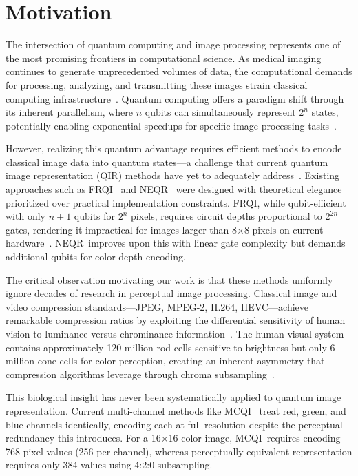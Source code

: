 \documentclass{ipol}
\newcommand{\frqi}{\textsc{FRQI}}
\newcommand{\neqr}{\textsc{NEQR}}
\newcommand{\mcqi}{\textsc{MCQI}}
\begin{document}
\FloatBarrier
\section{Motivation}
\label{sec:motivation}

The intersection of quantum computing and image processing represents one of
the most promising frontiers in computational science. As medical imaging
continues to generate unprecedented volumes of data, the computational
demands for processing, analyzing, and transmitting these images strain
classical computing infrastructure~\cite{ref1}. Quantum computing offers a
paradigm shift through its inherent parallelism, where $n$ qubits can
simultaneously represent $2^n$ states, potentially enabling exponential
speedups for specific image processing tasks~\cite{ref2}.

However, realizing this quantum advantage requires efficient methods to
encode classical image data into quantum states---a challenge that current
quantum image representation (QIR) methods have yet to adequately address~\cite{ref45,ref52,ref63}.
Existing approaches such as \frqi~\cite{ref3} and \neqr~\cite{ref4} were
designed with theoretical elegance prioritized over practical implementation
constraints. \frqi, while qubit-efficient with only $n+1$ qubits for $2^n$
pixels, requires circuit depths proportional to $2^{2n}$ gates, rendering it
impractical for images larger than 8$\times$8 pixels on current
hardware~\cite{ref5}. \neqr\ improves upon this with linear gate complexity
but demands additional qubits for color depth encoding.

The critical observation motivating our work is that these methods uniformly
ignore decades of research in perceptual image processing. Classical image and
video compression standards---JPEG, MPEG-2, H.264, HEVC---achieve remarkable
compression ratios by exploiting the differential sensitivity of human vision
to luminance versus chrominance information~\cite{ref6}. The human visual
system contains approximately 120 million rod cells sensitive to brightness
but only 6 million cone cells for color perception, creating an inherent
asymmetry that compression algorithms leverage through chroma
subsampling~\cite{ref7}.

This biological insight has never been systematically applied to quantum image
representation. Current multi-channel methods like \mcqi~\cite{ref8} treat
red, green, and blue channels identically, encoding each at full resolution
despite the perceptual redundancy this introduces. For a 16$\times$16 color
image, \mcqi\ requires encoding 768 pixel values (256 per channel), whereas
perceptually equivalent representation requires only 384 values using 4:2:0
subsampling.
\end{document}
